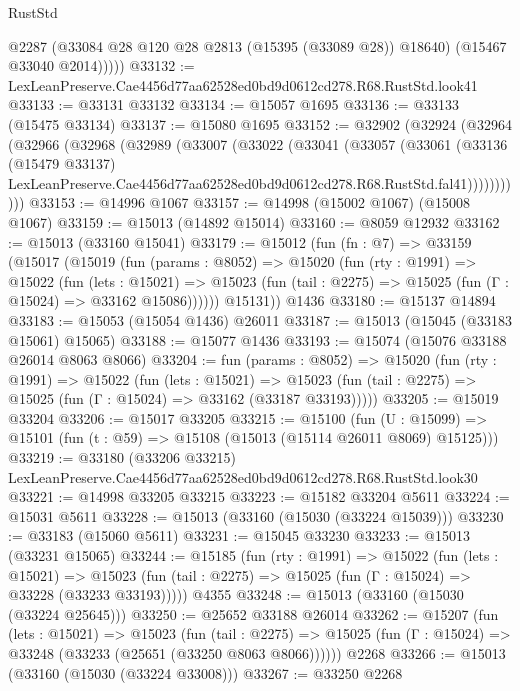 \begin{lexlean}{RustStd}
\begin{coremodule}
            @2287
            (@33084 @28 @120 @28 @2813 (@15395 (@33089 @28)) @18640)
            (@15467 @33040 @2014)))))
@33132 := LexLeanPreserve.Cae4456d77aa62528ed0bd9d0612cd278.R68.RustStd.look41
@33133 := @33131 @33132
@33134 := @15057 @1695
@33136 := @33133 (@15475 @33134)
@33137 := @15080 @1695
@33152 := @32902
    (@32924
      (@32964
        (@32966
          (@32968
            (@32989
              (@33007
                (@33022
                  (@33041
                    (@33057
                      (@33061
                        (@33136
                          (@15479 @33137)
                          LexLeanPreserve.Cae4456d77aa62528ed0bd9d0612cd278.R68.RustStd.fal41)))))))))))
@33153 := @14996 @1067
@33157 := @14998 (@15002 @1067) (@15008 @1067)
@33159 := @15013 (@14892 @15014)
@33160 := @8059 @12932
@33162 := @15013 (@33160 @15041)
@33179 := @15012
    (fun (fn : @7) =>
    @33159
      (@15017
        (@15019
          (fun (params : @8052) =>
          @15020
            (fun (rty : @1991) =>
            @15022
              (fun (lets : @15021) =>
              @15023 (fun (tail : @2275) => @15025 (fun (Γ : @15024) => @33162 @15086))))))
        @15131))
    @1436
@33180 := @15137 @14894
@33183 := @15053 (@15054 @1436) @26011
@33187 := @15013 (@15045 (@33183 @15061) @15065)
@33188 := @15077 @1436
@33193 := @15074 (@15076 @33188 @26014 @8063 @8066)
@33204 := fun (params : @8052) =>
  @15020
    (fun (rty : @1991) =>
    @15022
      (fun (lets : @15021) =>
      @15023 (fun (tail : @2275) => @15025 (fun (Γ : @15024) => @33162 (@33187 @33193)))))
@33205 := @15019 @33204
@33206 := @15017 @33205
@33215 := @15100
    (fun (U : @15099) => @15101 (fun (t : @59) => @15108 (@15013 (@15114 @26011 @8069) @15125)))
@33219 := @33180
    (@33206 @33215)
    LexLeanPreserve.Cae4456d77aa62528ed0bd9d0612cd278.R68.RustStd.look30
@33221 := @14998 @33205 @33215
@33223 := @15182 @33204 @5611
@33224 := @15031 @5611
@33228 := @15013 (@33160 (@15030 (@33224 @15039)))
@33230 := @33183 (@15060 @5611)
@33231 := @15045 @33230
@33233 := @15013 (@33231 @15065)
@33244 := @15185
    (fun (rty : @1991) =>
    @15022
      (fun (lets : @15021) =>
      @15023 (fun (tail : @2275) => @15025 (fun (Γ : @15024) => @33228 (@33233 @33193)))))
    @4355
@33248 := @15013 (@33160 (@15030 (@33224 @25645)))
@33250 := @25652 @33188 @26014
@33262 := @15207
    (fun (lets : @15021) =>
    @15023
      (fun (tail : @2275) =>
      @15025 (fun (Γ : @15024) => @33248 (@33233 (@25651 (@33250 @8063 @8066))))))
    @2268
@33266 := @15013 (@33160 (@15030 (@33224 @33008)))
@33267 := @33250 @2268

\end{coremodule}
\end{lexlean}

